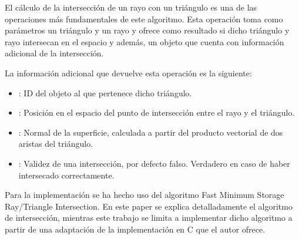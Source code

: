 El cálculo de la intersección de un rayo con un triángulo es una de las operaciones más fundamentales de este algoritmo. Esta operación toma como parámetros un triángulo  y un rayo  y ofrece como resultado si dicho triángulo y rayo intersecan en el espacio y además, un objeto que cuenta con información adicional de la intersección.

La información adicional que devuelve esta operación es la siguiente:

\begin{itemize}
	
	\item {}: ID del objeto al que pertenece dicho triángulo.
	
	\item {}: Posición en el espacio del punto de intersección entre el rayo y el triángulo.
	
	\item {}: Normal de la superficie, calculada a partir del producto vectorial de dos aristas del triángulo.
	
	\item {}: Validez de una intersección, por defecto falso. Verdadero en caso de haber intersecado correctamente.

\end{itemize}

Para la implementación se ha hecho uso del algoritmo Fast Minimum Storage Ray/Triangle Intersection\cite{moller1997fast}. En este paper se explica detalladamente el algoritmo de intersección, mientras este trabajo se limita a implementar dicho algoritmo a partir de una adaptación de la implementación en C que el autor ofrece.
	
